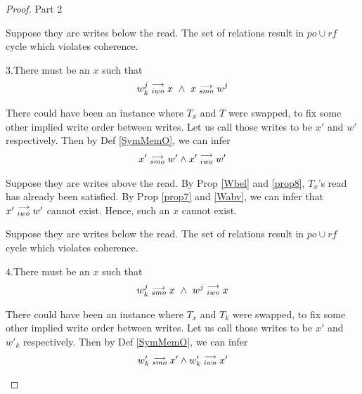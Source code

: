 \begin{proof}{Part 2}
\begin{itemize}
                        Suppose they are writes below the read.
                        The set of relations result in $po \cup rf$ cycle which violates coherence.  

                        3.There must be an $x$ such that 
                        \begin{align*}
                            \reln{w_k^j}{iwo}{x} \ \wedge \ \reln{x}{smo}{w^j}
                        \end{align*}

                        There could have been an instance where $T_x$ and $T$ were swapped, to fix some other implied write order between writes. 
                        Let us call those writes to be $x'$ and $w'$ respectively.
                        Then by Def \ref{SymMemO}, we can infer 
                        \begin{align*}
                            x'\stackrel{\longrightarrow}{_{smo}}w' \wedge x'\stackrel{\longrightarrow}{_{iwo}}w'
                        \end{align*}
                        
                        Suppose they are writes above the read.                         
                        By Prop \ref{Wbel} and \ref{prop8}, $T_x$'s read has already been satisfied. By Prop \ref{prop7} and \ref{Wabv}, we can infer that $x'\stackrel{\longrightarrow}{_{iwo}}w'$ cannot exist. Hence, such an $x$ cannot exist. 
                        
                        Suppose they are writes below the read.
                        The set of relations result in $po \cup rf$ cycle which violates coherence.  

                        4.There must be an $x$ such that 
                        \begin{align*}
                            \reln{w_k^j}{smo}{x} \ \wedge \ \reln{w^j}{iwo}{x}
                        \end{align*}

                        There could have been an instance where $T_x$ and $T_k$ were swapped, to fix some other implied write order between writes. 
                        Let us call those writes to be $x'$ and $w'_k$ respectively.
                        Then by Def \ref{SymMemO}, we can infer 
                        \begin{align*}
                            w'_k\stackrel{\longrightarrow}{_{smo}}x' \wedge w'_k\stackrel{\longrightarrow}{_{iwo}}x'
                        \end{align*}
                        

\end{itemize}
\end{proof}
